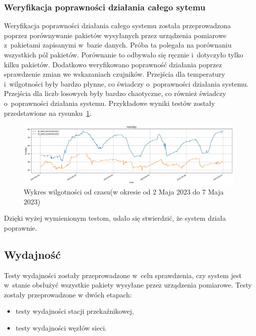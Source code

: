 \subsubsection{Weryfikacja poprawności działania całego sytemu}
Weryfikacja poprawności działania całego systemu została przeprowadzona poprzez porównywanie pakietów wysyłanych przez urządzenia pomiarowe z~pakietami zapisanymi w~bazie danych.
Próba ta polegała na porównaniu wszystkich pól pakietów.
Porównanie to odbywało się ręcznie i~dotyczyło tylko kilku pakietów.
Dodatkowo weryfikowano poprawność działania poprzez sprawdzenie zmian we wskazaniach czujników.
Przejścia dla temperatury i~wilgotności były bardzo płynne, co świadczy o~poprawności działania systemu.
Przejścia dla liczb losowych były bardzo chaotyczne, co również świadczy o~poprawności działania systemu.
Przykładowe wyniki testów zostały przedstawione na rysunku~\ref{rys:porownanie-hum}.
\begin{figure}[b!]
    \begin{center}
        \includegraphics[width=15cm]{pic/diagram-humidity.png}
    \end{center}
    \caption{Wykres wilgotności od czasu(w okresie od 2 Maja 2023 do 7 Maja 2023)}\label{rys:porownanie-hum}
\end{figure}


Dzięki wyżej wymienionym testom, udało się stwierdzić, że system działa poprawnie.

\subsection{Wydajność}
Testy wydajności zostały przeprowadzone w~celu sprawdzenia, czy system jest w~stanie obsłużyć wszystkie pakiety wysyłane przez urządzenia pomiarowe.
Testy zostały przeprowadzone w dwóch etapach:
\begin{itemize}
    \item testy wydajności stacji przekaźnikowej,
    \item testy wydajności węzłów sieci.
\end{itemize}

